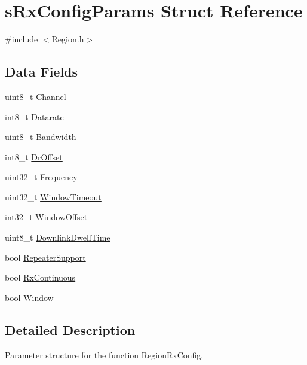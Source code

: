 \hypertarget{structsRxConfigParams}{}\section{s\+Rx\+Config\+Params Struct Reference}
\label{structsRxConfigParams}


{\ttfamily \#include $<$Region.\+h$>$}

\subsection*{Data Fields}
\begin{DoxyCompactItemize}
\item 
uint8\+\_\+t \hyperlink{structsRxConfigParams_a32ac373f78a03da5f2b41b1be1b49d80}{Channel}
\item 
int8\+\_\+t \hyperlink{structsRxConfigParams_ad64d85b6c7b8b3d9b41aa28eaf4fcac2}{Datarate}
\item 
uint8\+\_\+t \hyperlink{structsRxConfigParams_a2c78d3dee4a8229d33ec621ca4c71638}{Bandwidth}
\item 
int8\+\_\+t \hyperlink{structsRxConfigParams_ac22b6867751b80613469c74b718bd361}{Dr\+Offset}
\item 
uint32\+\_\+t \hyperlink{structsRxConfigParams_a83ee523b7d7f082e2cac91407db2c2f1}{Frequency}
\item 
uint32\+\_\+t \hyperlink{structsRxConfigParams_afcae1c867cd1a7d0e4b3bab5b8bb8a86}{Window\+Timeout}
\item 
int32\+\_\+t \hyperlink{structsRxConfigParams_a323502f534f1a5ae832a9f00ce72c51e}{Window\+Offset}
\item 
uint8\+\_\+t \hyperlink{structsRxConfigParams_a4e1670a845c7ff99f601cb106e66fcaf}{Downlink\+Dwell\+Time}
\item 
bool \hyperlink{structsRxConfigParams_a0d18669fcf68efa8a06b664a8f297f8c}{Repeater\+Support}
\item 
bool \hyperlink{structsRxConfigParams_a1359157dd4e303171ed204febc7c58e0}{Rx\+Continuous}
\item 
bool \hyperlink{structsRxConfigParams_acae0e0d5f43b8a7136847d0ca3d3a60c}{Window}
\end{DoxyCompactItemize}


\subsection{Detailed Description}
Parameter structure for the function Region\+Rx\+Config. 

